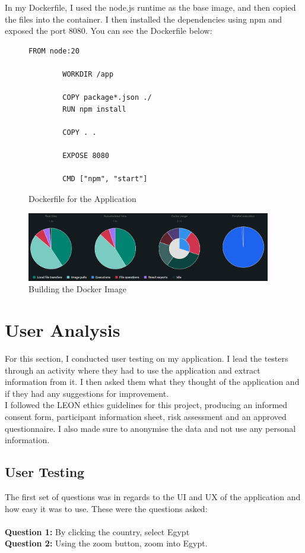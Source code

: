 \documentclass{report}
\begin{document}
In my Dockerfile, I used the node.js runtime as the base image, and then copied the files into the container. I then installed the dependencies using npm and exposed the port 8080. You can see the Dockerfile below:

\begin{figure}[h]
    \centering
    \begin{lstlisting}[language=Docker]
        FROM node:20

        WORKDIR /app

        COPY package*.json ./
        RUN npm install

        COPY . .

        EXPOSE 8080

        CMD ["npm", "start"]
    \end{lstlisting}
    \caption{Dockerfile for the Application}
    \label{fig:dockerfile}
\end{figure}
\begin{center}
    \begin{figure}[h]
        \centering
        \includegraphics[width=0.95\textwidth]{Images/docker-build.png}
        \caption{Building the Docker Image}
        \label{fig:docker-build}
    \end{figure}
\end{center}

\chapter{User Analysis}
For this section, I conducted user testing on my application. I lead the testers through an activity where they had to use the application and extract information from it. I then asked them what they thought of the application and if they had any suggestions for improvement.\\

I followed the LEON ethics guidelines for this project, producing an informed consent form, participant information sheet, risk assessment and an approved questionnaire. I also made sure to anonymise the data and not use any personal information.
\section{User Testing}
The first set of questions was in regards to the UI and UX of the application and how easy it was to use. These were the questions asked:\\ \\
\textbf{Question 1: }By clicking the country, select Egypt\\
\textbf{Question 2: }Using the zoom button, zoom into Egypt.\\
\end{document}
